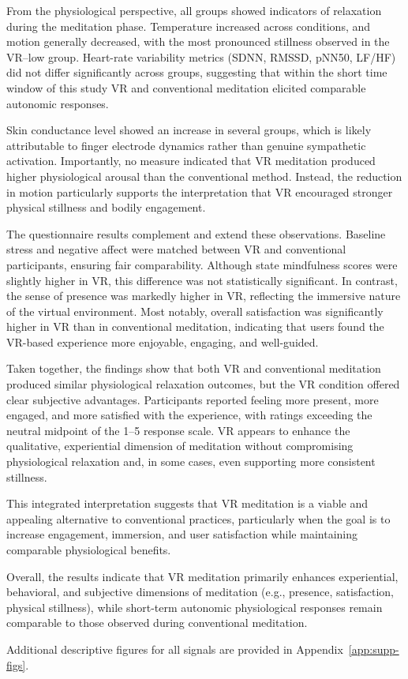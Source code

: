From the physiological perspective, all groups showed indicators of relaxation during the meditation phase. Temperature increased across conditions, and motion generally decreased, with the most pronounced stillness observed in the VR–low group. Heart-rate variability metrics (SDNN, RMSSD, pNN50, LF/HF) did not differ significantly across groups, suggesting that within the short time window of this study VR and conventional meditation elicited comparable autonomic responses.

Skin conductance level showed an increase in several groups, which is likely attributable to finger electrode dynamics rather than genuine sympathetic activation. Importantly, no measure indicated that VR meditation produced higher physiological arousal than the conventional method. Instead, the reduction in motion particularly supports the interpretation that VR encouraged stronger physical stillness and bodily engagement.

The questionnaire results complement and extend these observations. Baseline stress and negative affect were matched between VR and conventional participants, ensuring fair comparability. Although state mindfulness scores were slightly higher in VR, this difference was not statistically significant. In contrast, the sense of presence was markedly higher in VR, reflecting the immersive nature of the virtual environment. Most notably, overall satisfaction was significantly higher in VR than in conventional meditation, indicating that users found the VR-based experience more enjoyable, engaging, and well-guided.

Taken together, the findings show that both VR and conventional meditation produced similar physiological relaxation outcomes, but the VR condition offered clear subjective advantages. Participants reported feeling more present, more engaged, and more satisfied
with the experience, with ratings exceeding the neutral midpoint of the
1--5 response scale. VR appears to enhance the qualitative, experiential dimension of meditation without compromising physiological relaxation and, in some cases, even supporting more consistent stillness.

This integrated interpretation suggests that VR meditation is a viable and appealing alternative to conventional practices, particularly when the goal is to increase engagement, immersion, and user satisfaction while maintaining comparable physiological benefits.

Overall, the results indicate that VR meditation primarily enhances
experiential, behavioral, and subjective dimensions of meditation
(e.g., presence, satisfaction, physical stillness), while short-term
autonomic physiological responses remain comparable to those observed
during conventional meditation.


Additional descriptive figures for all signals are provided in Appendix~\ref{app:supp-figs}.

